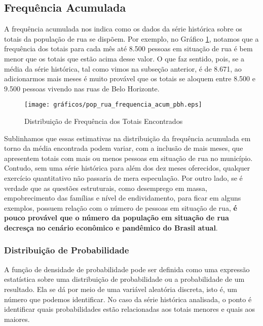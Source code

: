 \documentclass[12pt]{article}
\begin{document}
\subsection{Frequência Acumulada}  

A frequência acumulada nos indica como os dados da série histórica sobre os totais da população de rua se dispõem. Por exemplo, no Gráfico \ref{fig:pop_rua_freq_acum}, notamos que a frequência dos totais para cada mês até 8.500 pessoas em situação de rua é bem menor que os totais que estão acima desse valor. O que faz sentido, pois, se a média da série histórica, tal como vimos na subseção anterior, é de 8.671, ao adicionarmos mais meses é muito provável que os totais se aloquem entre 8.500 e 9.500 pessoas vivendo nas ruas de Belo Horizonte.\\  

\begin{figure}[H]
\centering
	\caption{Distribuição de Frequência dos Totais Encontrados}
	\texttt{[image: gráficos/pop\_rua\_frequencia\_acum\_pbh.eps]}
	\label{fig:pop_rua_freq_acum}
\end{figure}

Sublinhamos que essas estimativas na distribuição da frequência acumulada em torno da média encontrada podem variar, com a inclusão de mais meses, que apresentem totais com mais ou menos pessoas em situação de rua no município. Contudo, sem uma série histórica para além dos dez meses oferecidos, qualquer exercício quantitativo não passaria de mera especulação. Por outro lado, se é verdade que as questões estruturais, como desemprego em massa, empobrecimento das famílias e nível de endividamento, para ficar em alguns exemplos, possuem relação com o número de pessoas em situação de rua, \textbf{é pouco provável que o número da população em situação de rua decresça no cenário econômico e pandêmico do Brasil atual}.

\subsubsection{Distribuição de Probabilidade}  

A função de densidade de probabilidade pode ser definida como uma expressão estatística sobre uma distribuição de probabilidade ou a probabilidade de um resultado. Ela se dá por meio de uma variável aleatória discreta, isto é, um número que podemos identificar. No caso da série histórica analisada, o ponto é identificar quais probabilidades estão relacionadas aos totais menores e quais aos maiores.\\
\end{document}
